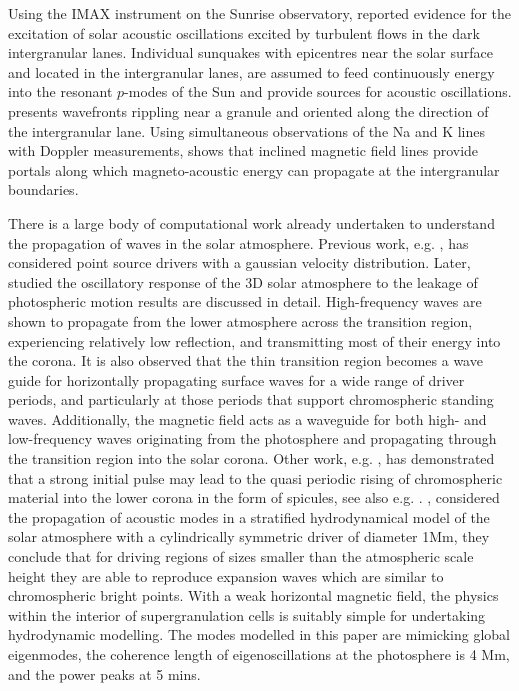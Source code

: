 \documentclass[preprint,authoryear,12pt]{elsarticle}
\begin{document}
Using the IMAX instrument on the Sunrise observatory, \citet{Roth2010}  reported evidence for the excitation of solar acoustic oscillations excited by turbulent flows  in the dark intergranular lanes.  Individual sunquakes with epicentres near the solar surface and located in the intergranular lanes, are assumed to feed continuously energy into the resonant $p$-modes of the Sun and provide sources for acoustic oscillations. \citet{Roth2010} presents wavefronts rippling near a granule and oriented along the direction of the intergranular lane. Using simultaneous observations of the Na and K lines with Doppler measurements, \citet{Jefferies2006} shows that inclined magnetic field lines provide portals along which magneto-acoustic energy can propagate at the intergranular boundaries.

There is a large body of computational work already undertaken to understand the propagation of waves in the solar atmosphere. Previous work, e.g. \citet{Erdelyi2007}, has considered point source drivers with a gaussian velocity distribution. Later, \citet{Fedun2009} studied the oscillatory response of the 3D solar atmosphere to the leakage of photospheric motion results are discussed in detail. High-frequency waves are shown to propagate from the lower atmosphere across the transition region, experiencing relatively low reflection, and transmitting most of their energy into the corona. It is also observed that the thin transition region becomes a wave guide for horizontally propagating surface waves for a wide range of driver periods, and particularly at those periods that support chromospheric standing waves. Additionally, the magnetic field acts as a waveguide for both high- and low-frequency waves originating from the photosphere and propagating through the transition region into the solar corona.  Other work, e.g.  \citet{Murawski2010}, has demonstrated that a strong initial pulse may lead to the quasi periodic rising of chromospheric material into the lower corona in the form of spicules, see also e.g. \citet{Khomenko2013}. \citet{Kalkofen2010}, considered the propagation of acoustic modes in a stratified hydrodynamical model of the solar atmosphere with a cylindrically symmetric driver of diameter 1Mm, they conclude that for driving regions of sizes smaller than the atmospheric scale height they are able to reproduce expansion waves which are similar to chromospheric bright points. With a weak horizontal magnetic field, the physics within the interior of supergranulation cells \citet{Lites2008} is suitably simple for undertaking hydrodynamic modelling. The modes modelled in this paper are mimicking global eigenmodes, the coherence length of eigenoscillations at the photosphere is 4 Mm, and the power peaks at 5 mins. 
\end{document}
